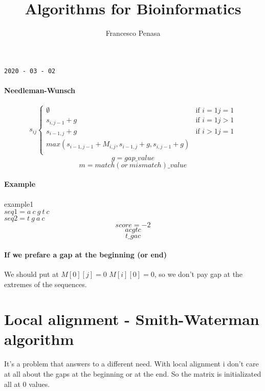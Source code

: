 \documentclass[11pt]{article}
\begin{document}
\author{Francesco Penasa}
\title{Algorithms for Bioinformatics}
\maketitle

\medskip

\texttt{2020 - 03 - 02}
\paragraph{Needleman-Wunsch} %
\label{par:needleman_wunsch}

\[	s_{ij} 
	\begin{cases}
		 \emptyset   	& \mbox{if } i=1 j=1 \\
		 s_{i, j-1} + g &   \mbox{if } i=1 j>1 \\
		 s_{i-1, j} + g &  \mbox{if } i>1 j=1 \\
		 max(s_{i-1, j-1} + M_{i,j}, s_{i-1, j} + g, s_{i, j-1} + g)  \\
	\end{cases}
\]
\[
	g = gap\_value 
\]
\[
	m = match(or\ mismatch)\_value
\]


\paragraph{Example} %
\label{par:example}
example1\\
$seq1 = a \ c \ g \ t \ c $\\
$seq2 = t \ g \ a \ c $ \\
\[
 	score = -2
 \] 
\[
	acgtc
\]
\[
	t\_gac
\]

\paragraph{If we prefare a gap at the beginning (or end)\\} %
\label{par:if_i_don_t_care_about_a_gap_at_the_beginning}
We should put at $M[0][j] = 0$ $M[i][0] = 0$, so we don't pay gap at the extremes of the sequences.\\



\newpage
\section{Local alignment - Smith-Waterman algorithm} %
\label{sec:local_alignment}
It's a problem that answers to a different need.
With local alignment i don't care at all about the gaps at the beginning or at the end.
So the matrix is initializated all at 0 values.
\end{document}
